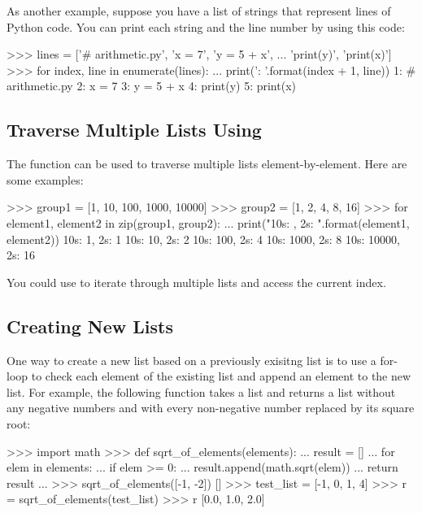 \documentclass[11pt]{cselabheader}
\begin{document}
As another example, suppose you have a list of strings that represent lines of
Python code. You can print each string and the line number by using this code:

\begin{pyconcode}
>>> lines = ['# arithmetic.py', 'x = 7', 'y = 5 + x',
...          'print(y)', 'print(x)']
>>> for index, line in enumerate(lines):
...     print('{}: {}'.format(index + 1, line))
1: # arithmetic.py
2: x = 7
3: y = 5 + x
4: print(y)
5: print(x)

\end{pyconcode}

\subsection{\texorpdfstring%
  {Traverse Multiple Lists Using }
  {Traverse Multiple Lists Using zip()}}

The  function can be used to traverse multiple lists
element-by-element. Here are some examples:

\begin{pyconcode}
>>> group1 = [1, 10, 100, 1000, 10000]
>>> group2 = [1, 2, 4, 8, 16]
>>> for element1, element2 in zip(group1, group2):
...     print("10s: {}, 2s: {}".format(element1, element2))
10s: 1, 2s: 1
10s: 10, 2s: 2
10s: 100, 2s: 4
10s: 1000, 2s: 8
10s: 10000, 2s: 16

\end{pyconcode}

You could use  to iterate through multiple lists and access the current index.

\subsection{Creating New Lists}
One way to create a new list based on a previously exisitng list is to use
a for-loop to check each element of the existing list and append
an element to the new list.
For example, the following function takes a list and returns
a list without any negative numbers and with every non-negative number
replaced by its square root:

\begin{pyconcode}
>>> import math
>>> def sqrt_of_elements(elements):
...     result = []
...     for elem in elements:
...         if elem >= 0:
...             result.append(math.sqrt(elem))
...     return result
...
>>> sqrt_of_elements([-1, -2])
[]
>>> test_list = [-1, 0, 1, 4]
>>> r = sqrt_of_elements(test_list)
>>> r
[0.0, 1.0, 2.0]

\end{pyconcode}
\end{document}
